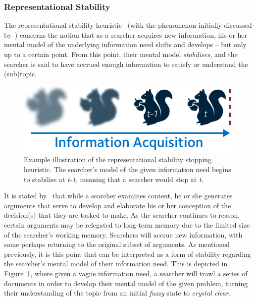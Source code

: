 \subsubsection{Representational Stability}\label{sec:stopping_background:heuristics:representational}
The representational stability heuristic~\citep{nickles1995judgment} (with the phenomenon initially discussed by~\cite{yates1982toward}) concerns the notion that as a searcher acquires new information, his or her mental model of the underlying information need shifts and develops -- but only up to a certain point. From this point, their mental model \emph{stabilises,} and the searcher is said to have accrued enough information to satisfy or understand the (sub)topic.

\begin{figure}
    \begin{center}
    \vspace*{-6mm}
    \includegraphics[width=1\textwidth]{figures/ch3-representational.pdf}
    \end{center}
    \vspace*{-5mm}
    \caption[Representational stability stopping heuristic]{Example illustration of the representational stability stopping heuristic. The searcher's model of the given information need begins to stabilise at \emph{t-1}, meaning that a searcher would stop at \emph{t}.}
    \label{fig:representational_heuristic}
\end{figure}

It is stated by~\cite{nickles1995judgment} that while a searcher examines content, he or she generates arguments that serve to develop and elaborate his or her conception of the decision(s) that they are tasked to make. As the searcher continues to reason, certain arguments may be relegated to long-term memory due to the limited size of the searcher's working memory. Searchers will accrue new information, with some perhaps returning to the original subset of arguments. As mentioned previously, it is this point that can be interpreted as a form of stability regarding the searcher's mental model of their information need. This is depicted in Figure~\ref{fig:representational_heuristic}, where given a vague information need, a searcher will trawl a series of documents in order to develop their mental model of the given problem, turning their understanding of the topic from an initial \emph{fuzzy} state to \emph{crystal clear.}

